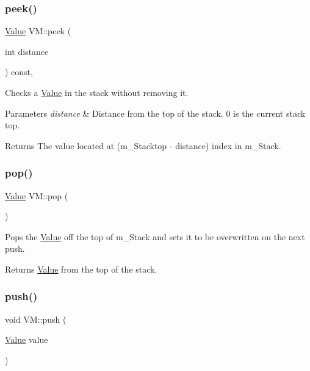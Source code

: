 \subsubsection{\texorpdfstring{peek()}{peek()}}
{\footnotesize\ttfamily \hyperlink{class_value}{Value} V\+M\+::peek (\begin{DoxyParamCaption}\item[{int}]{distance }\end{DoxyParamCaption}) const\hspace{0.3cm}{\ttfamily [inline]}, {\ttfamily [private]}}



Checks a \hyperlink{class_value}{Value} in the stack without removing it. 


\begin{DoxyParams}{Parameters}
{\em distance} & Distance from the top of the stack. 0 is the current stack top. \\
\hline
\end{DoxyParams}
\begin{DoxyReturn}{Returns}
The value located at (m\+\_\+\+Stacktop -\/ distance) index in m\+\_\+\+Stack. 
\end{DoxyReturn}
\mbox{\label{class_v_m_af5f97f93ca522dd02dbaba309fd1706c}} 
\subsubsection{\texorpdfstring{pop()}{pop()}}
{\footnotesize\ttfamily \hyperlink{class_value}{Value} V\+M\+::pop (\begin{DoxyParamCaption}{ }\end{DoxyParamCaption})\hspace{0.3cm}{\ttfamily [private]}}



Pops the \hyperlink{class_value}{Value} off the top of m\+\_\+\+Stack and sets it to be overwritten on the next push. 

\begin{DoxyReturn}{Returns}
\hyperlink{class_value}{Value} from the top of the stack. 
\end{DoxyReturn}
\mbox{\label{class_v_m_a80a5bb010fca8e1fc5e1108195fec425}} 
\subsubsection{\texorpdfstring{push()}{push()}}
{\footnotesize\ttfamily void V\+M\+::push (\begin{DoxyParamCaption}\item[{\hyperlink{class_value}{Value}}]{value }\end{DoxyParamCaption})\hspace{0.3cm}{\ttfamily [private]}}



